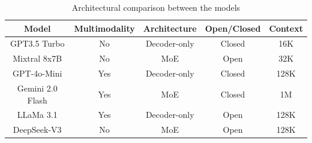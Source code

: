 \begin{table}[htbp]
    \centering
    \renewcommand{\arraystretch}{1.2}
    \begin{tabular}{|c|c|c|c|c|}
    \hline
    \textbf{Model} & \textbf{Multimodality} & \textbf{Architecture} & \textbf{Open/Closed} & \textbf{Context} \\
    \hline
    GPT3.5 Turbo & No & Decoder-only & Closed & 16K \\
    Mixtral 8x7B & No & MoE & Open & 32K \\
    GPT-4o-Mini & Yes & Decoder-only & Closed & 128K \\
    Gemini 2.0 Flash & Yes & MoE & Closed & 1M \\
    LLaMa 3.1 & Yes & Decoder-only & Open & 128K \\
    DeepSeek-V3 & No & MoE & Open & 128K \\
    \hline
    \end{tabular}
    \caption{Architectural comparison between the models}
    \label{tab:confronto-modelli}
    \end{table}
